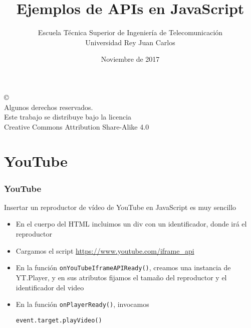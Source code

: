 \documentclass[ucs]{beamer}
\begin{document}
\title[Ejemplos de APIs]{Ejemplos de APIs en JavaScript}
\author[GSyC]{Escuela Técnica Superior de Ingeniería de Telecomunicación\\
Universidad Rey Juan Carlos}
\date[2017]{Noviembre de 2017}


\begin{frame}
  \titlepage
\end{frame}




\begin{frame}[b]
\begin{flushright}
{\tiny
\copyright \insertshortdate~\insertshortauthor \\
  Algunos derechos reservados. \\
  Este trabajo se distribuye bajo la licencia \\
  Creative Commons Attribution Share-Alike 4.0
}
\end{flushright}
\end{frame}



%

\section{YouTube}


\begin{frame}[fragile]
\frametitle{YouTube}
Insertar un reproductor de vídeo de YouTube en JavaScript es muy sencillo

\begin{itemize}
\item
En el cuerpo del HTML incluimos un div con un identificador, donde irá el reproductor

\item
Cargamos el script
\url{https://www.youtube.com/iframe_api}

\item
En la función
\verb|onYouTubeIframeAPIReady()|,
creamos una instancia de YT.Player, y en sus atributos
fijamos el tamaño del reproductor y el identificador del video

\item
En la función
\verb|onPlayerReady()|,
invocamos 

\verb|event.target.playVideo()|
\end{itemize}
\end{frame}
\end{document}
